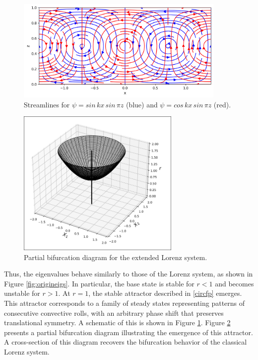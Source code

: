 \documentclass[paper=a4, fontsize=11pt]{scrartcl}
\numberwithin{equation}{section}		%
\numberwithin{figure}{section}			%
\numberwithin{table}{section}				%
\begin{document}
\begin{figure}[hbt!]
	\centering
	\includegraphics[width=0.9\textwidth]{media/extendedstreamlines.png}
	\caption{Streamlines for $\psi = sin \, kx \, sin \, \pi z$ (blue) and $\psi = cos \, kx \, sin \, \pi z$ (red).}
	\label{fig:extendedstreamlines}
\end{figure}


\begin{figure}[hbt!]
	\centering
	\includegraphics[width=0.7\textwidth]{media/extendedbifurcationdiagram.png}
	\caption{Partial bifurcation diagram for the extended Lorenz system.}
	\label{fig:extbifurcationdiag}
\end{figure}

Thus, the eigenvalues behave similarly to those of the Lorenz system, as shown in Figure \ref{fig:origineigs}. In particular, the base state is stable for $r<1$ and becomes unstable for $r>1$. At $r=1$, the stable attractor described in \ref{circfp} emerges. This attractor corresponds to a family of steady states representing patterns of consecutive convective rolls, with an arbitrary phase shift that preserves translational symmetry. A schematic of this is shown in Figure \ref{fig:extendedstreamlines}. Figure \ref{fig:extbifurcationdiag} presents a partial bifurcation diagram illustrating the emergence of this attractor. A cross-section of this diagram recovers the bifurcation behavior of the classical Lorenz system.\\
\end{document}
